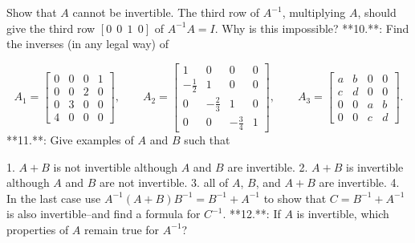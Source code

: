 Show that \(A\) cannot be invertible. The third row of \(A^{-1}\), multiplying \(A\), should give the third row \([0\ \ 0\ \ 1\ \ 0]\) of \(A^{-1}A=I\). Why is this impossible?
**10.**: Find the inverses (in any legal way) of

\[A_{1}=\begin{bmatrix}0&0&0&1\\ 0&0&2&0\\ 0&3&0&0\\ 4&0&0&0\end{bmatrix},\qquad A_{2}=\begin{bmatrix}1&0&0&0\\ -\frac{1}{2}&1&0&0\\ 0&-\frac{2}{3}&1&0\\ 0&0&-\frac{3}{4}&1\end{bmatrix},\qquad A_{3}=\begin{bmatrix}a&b&0&0\\ c&d&0&0\\ 0&0&a&b\\ 0&0&c&d\end{bmatrix}.\]
**11.**: Give examples of \(A\) and \(B\) such that

1. \(A+B\) is not invertible although \(A\) and \(B\) are invertible.
2. \(A+B\) is invertible although \(A\) and \(B\) are not invertible.
3. all of \(A\), \(B\), and \(A+B\) are invertible.
4. In the last case use \(A^{-1}(A+B)B^{-1}=B^{-1}+A^{-1}\) to show that \(C=B^{-1}+A^{-1}\) is also invertible--and find a formula for \(C^{-1}\).
**12.**: If \(A\) is invertible, which properties of \(A\) remain true for \(A^{-1}\)?

